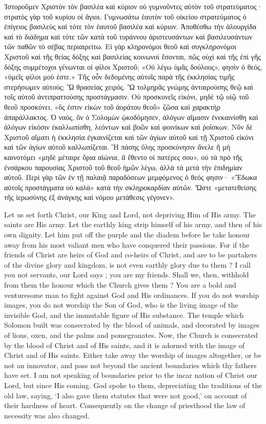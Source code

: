 \documentclass[10pt]{book}
\newcommand{\switchEnglish}{\selectlanguage{english} \switchcolumn}
\begin{document}
\begin{paracol}{2}
Ἱστοροῦμεν Χριστὸν τὸν βασιλέα καὶ κύριον οὐ γυμνοῦντες αὐτὸν τοῦ
στρατεύματος· στρατὸς γὰρ τοῦ κυρίου οἱ ἅγιοι. Γυμνωσάτω ἑαυτὸν τοῦ οἰκείου
στρατεύματος ὁ ἐπίγειος βασιλεὺς καὶ τότε τὸν ἑαυτοῦ βασιλέα καὶ κύριον.
Ἀποθέσθω τὴν ἁλουργίδα καὶ τὸ διάδημα καὶ τότε τῶν κατὰ τοῦ τυράννου
ἀριστευσάντων καὶ βασιλευσάντων τῶν παθῶν τὸ σέβας περιαιρείτω. Εἰ γὰρ
κληρονόμοι θεοῦ καὶ συγκληρονόμοι Χριστοῦ καὶ τῆς θείας δόξης καὶ βασιλείας
κοινωνοὶ ἔσονται, πῶς οὐχὶ καὶ τῆς ἐπὶ γῆς δόξης συμμέτοχοι γένωνται οἱ
φίλοι Χριστοῦ; «Οὐ λέγω ὑμᾶς δούλους», φησὶν ὁ θεός, «ὑμεῖς φίλοι μού
ἐστε.» Τῆς οὖν δεδομένης αὐτοῖς παρὰ τῆς ἐκκλησίας τιμῆς στερήσωμεν αὐτούς;
Ὢ θρασείας χειρός. Ὢ τολμηρᾶς γνώμης ἀνταιρούσης θεῷ καὶ τοῖς αὐτοῦ
ἀντιπραττούσης προστάγμασιν. Οὐ προσκυνεῖς εἰκόνι, μηδὲ τῷ υἱῷ τοῦ θεοῦ
προσκύνει, «ὅς ἐστιν εἰκὼν τοῦ ἀοράτου θεοῦ» ζῶσα καὶ χαρακτὴρ
ἀπαράλλακτος.
Ὁ ναός, ὃν ὁ Σολομὼν ᾠκοδόμησεν, ἀλόγων αἵμασιν ἐνεκαινίσθη καὶ ἀλόγων
εἰκόσιν ἐκαλλωπίσθη, λεόντων καὶ βοῶν καὶ φοινίκων καὶ ῥοΐσκων. Νῦν δὲ
Χριστοῦ αἵματι ἡ ἐκκλησία ἐγκαινίζεται καὶ τῶν ἁγίων αὐτοῦ καὶ τῇ Χριστοῦ
εἰκόνι καὶ τῶν ἁγίων αὐτοῦ καλλωπίζεται. Ἢ πάσης ὕλης προσκύνησιν ἄνελε ἢ
μὴ καινοτόμει «μηδὲ μέταιρε ὅρια αἰώνια, ἃ ἔθεντο οἱ πατέρες σου», οὐ τὰ
πρὸ τῆς ἐνσάρκου παρουσίας Χριστοῦ τοῦ θεοῦ ἡμῶν λέγω, ἀλλὰ τὰ μετὰ τὴν
ἐπιδημίαν αὐτοῦ. Περὶ γὰρ τῶν ἐν τῇ παλαιᾷ παραδόσεων μεμφόμενος ὁ θεός
φησιν· «Ἔδωκα αὐτοῖς προστάγματα οὐ καλὰ» κατὰ τὴν σκληροκαρδίαν αὐτῶν.
Ὥστε «μετατεθείσης τῆς ἱερωσύνης ἐξ ἀνάγκης καὶ νόμου μετάθεσις γέγονεν».

\switchEnglish

Let us set forth Christ, our King and Lord, 
not depriving Him of His army. The saints 
are His army. Let the earthly king strip 
himself of his army, and then of his own 
dignity. Let him put off the purple and the 
diadem before he take honour away from his 
most valiant men who have conquered their 
passions. For if the friends of Christ are 
heirs of God and co-heirs of Christ, and are to 
be partakers of the divine glory and kingdom, 
is not even earthly glory due to them ? I call 
you not servants, our Lord says ; you are my 
friends. Shall we, then, withhold from them 
the honour which the Church gives them ? 
You are a bold and venturesome man to fight 
against God and His ordinances. If you do 
not worship images, you do not worship the 
Son of God, who is the living image of the 
invisible God, and the immutable figure of His 
substance. The temple which Solomon built 
was consecrated by the blood of animals, and 
decorated by images of lions, oxen, and the 
palms and pomegranates. Now, the Church 
is consecrated by the blood of Christ and of 
His saints, and it is adorned with the image of 
Christ and of His saints. Either take away 
the worship of images altogether, or be not an 
innovator, and pass not beyond the ancient 
boundaries which thy fathers have set. I am 
not speaking of boundaries prior to the incar 
nation of Christ our Lord, but since His 
coming. God spoke to them, depreciating the 
traditions of the old law, saying, `I also gave 
them statutes that were not good,' on account 
of their hardness of heart. Consequently on 
the change of priesthood the law of necessity 
was also changed. 


\end{paracol}
\end{document}
